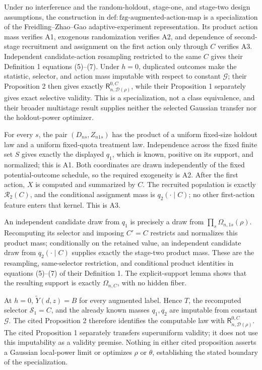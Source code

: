 Under no interference and the random-holdout, stage-one, and stage-two design assumptions, the construction in \(\mathrm{def{:}fzg\mbox{-}augmented\mbox{-}action\mbox{-}map}\) is a specialization of the Freidling--Zhao--Gao adaptive-experiment representation.  Its product action mass verifies A1, exogenous randomization verifies A2, and dependence of second-stage recruitment and assignment on the first action only through \(C\) verifies A3.  Independent candidate-action resampling restricted to the same \(C\) gives their Definition 1 equations (5)--(7).  Under \(h=0\), duplicated outcomes make the statistic, selector, and action mass imputable with respect to constant \(\mathcal G\); their Proposition 2 then gives exactly \(\mathsf R_{n,\mathcal D(\rho)}^{0,C}\), while their Proposition 1 separately gives exact selective validity.  This is a specialization, not a class equivalence, and their broader multistage result supplies neither the selected Gaussian transfer nor the holdout-power optimizer.

For every \(s\), the pair \((D_{ns},Z_{n1s})\) has the product of a uniform fixed-size holdout law and a uniform fixed-quota treatment law.  Independence across the fixed finite set \(S\) gives exactly the displayed \(q_1\), which is known, positive on its support, and normalized; this is A1.  Both coordinates are drawn independently of the fixed potential-outcome schedule, so the required exogeneity is A2.  After the first action, \(X\) is computed and summarized by \(C\).  The recruited population is exactly \(\mathcal R_2(C)\), and the conditional assignment mass is \(q_2(\cdot\mid C)\); no other first-action feature enters that kernel.  This is A3.

An independent candidate draw from \(q_1\) is precisely a draw from \(\prod_s\Omega_{n,1s}(\rho)\).  Recomputing its selector and imposing \(C'=C\) restricts and normalizes this product mass; conditionally on the retained value, an independent candidate draw from \(q_2(\cdot\mid C)\) supplies exactly the stage-two product mass.  These are the resampling, same-selector restriction, and conditional product identities in equations (5)--(7) of their Definition 1.  The explicit-support lemma shows that the resulting support is exactly \(\Omega_{n,C}\), with no hidden fiber.

At \(h=0\), \(\widetilde Y(d,z)=B\) for every augmented label.  Hence \(T\), the recomputed selector \(\mathcal S_1=C\), and the already known masses \(q_1,q_2\) are imputable from constant \(\mathcal G\).  The cited Proposition 2 therefore identifies the computable law with \(\mathsf R_{n,\mathcal D(\rho)}^{0,C}\).  The cited Proposition 1 separately transfers superuniform validity; it does not use this imputability as a validity premise.  Nothing in either cited proposition asserts a Gaussian local-power limit or optimizes \(\rho\) or \(\theta\), establishing the stated boundary of the specialization.

